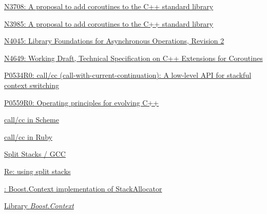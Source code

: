 \newpage
{}
\begin{thebibliography}{99}

        \href{http://www.open-std.org/jtc1/sc22/wg21/docs/papers/2013/n3708.pdf}
        {N3708: A proposal to add coroutines to the C++ standard library}

        \href{http://www.open-std.org/jtc1/sc22/wg21/docs/papers/2013/n3985.pdf}
        {N3985: A proposal to add coroutines to the C++ standard library}

        \href{http://www.open-std.org/jtc1/sc22/wg21/docs/papers/2014/n4045.pdf}
        {N4045: Library Foundations for Asynchronous Operations, Revision 2}

        \href{http://www.open-std.org/jtc1/sc22/wg21/docs/papers/2017/n4649.pdf}
        {N4649: Working Draft, Technical Specification on C++ Extensions for Coroutines}

        \href{http://www.open-std.org/jtc1/sc22/wg21/docs/papers/2017/p0534r0.pdf}
        {P0534R0: call/cc (call-with-current-continuation): A low-level API for stackful
        context switching}

        \href{http://www.open-std.org/jtc1/sc22/wg21/docs/papers/2017/p0559r0.pdf}
        {P0559R0: Operating principles for evolving C++}

        \href{http://community.schemewiki.org/?call-with-current-continuation}
        {call/cc in Scheme}

        \href{http://gnuu.org/2009/03/21/demystifying-continuations-in-ruby}
        {call/cc in Ruby}

        \href{http://gcc.gnu.org/wiki/SplitStacks}
        {Split Stacks / GCC}

        \href{https://gcc.gnu.org/ml/gcc-help/2012-03/msg00395.html}
        {Re: using split stacks}

        \href{https://github.com/boostorg/context/blob/master/include/boost/context/posix/segmented_stack.hpp}
        {: Boost.Context implementation
        of  StackAllocator}

        \href{http://www.boost.org/doc/libs/release/libs/context/doc/html/index.html}
        {Library \emph{Boost.Context}}


\end{thebibliography}
